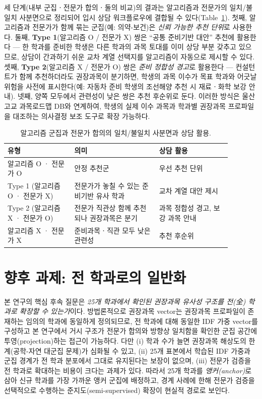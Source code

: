 \documentclass[conference]{IEEEtran}
\begin{document}
세 단계(내부 군집ㆍ전문가 합의ㆍ둘의 비교)의 결과는 알고리즘과 전문가의 일치/불일치 사분면으로 정리되어 입시 상담 워크플로우에 결합될 수 있다(Table~\ref{tab:quadrant}).
첫째, 알고리즘과 전문가가 함께 묶는 군집(예: 의약-보건)은 \emph{신뢰 가능한 추천 단위}로 사용한다.
둘째, \textbf{Type 1}(알고리즘 O / 전문가 X) 쌍은 ``공통 준비기반 대안'' 추천에 활용한다 --- 한 학과를 준비한 학생은 다른 학과의 과목 토대를 이미 상당 부분 갖추고 있으므로, 상담이 간과하기 쉬운 교차 계열 선택지를 알고리즘이 자동으로 제시할 수 있다.
셋째, \textbf{Type 2}(알고리즘 X / 전문가 O) 쌍은 \emph{준비 정합성 경고}로 활용한다 --- 컨설턴트가 함께 추천하더라도 권장과목이 분기하면, 학생의 과목 이수가 목표 학과와 어긋날 위험을 사전에 표시한다(예: 자동차 준비 학생의 조선해양 추천 시 재료ㆍ화학 보강 안내).
넷째, 양쪽 모두에서 관련성이 낮은 쌍은 추천 후순위로 둔다.
이러한 방식은 울산 고교 과목로드맵 DB와 연계하여, 학생의 실제 이수 과목과 학과별 권장과목 프로파일을 대조하는 의사결정 보조 도구로 확장 가능하다.

\begin{table}[!ht]
\centering
\footnotesize
\caption{알고리즘 군집과 전문가 합의의 일치/불일치 사분면과 상담 활용.}
\label{tab:quadrant}
\begin{tabular}{p{0.26\linewidth}p{0.33\linewidth}p{0.29\linewidth}}
\hline
유형 & 의미 & 상담 활용 \\
\hline
알고리즘 O · 전문가 O & 안정 추천군 & 우선 추천 단위 \\
Type 1 (알고리즘 O · 전문가 X) & 전문가가 놓칠 수 있는 준비기반 유사 학과 & 교차 계열 대안 제시 \\
Type 2 (알고리즘 X · 전문가 O) & 전문가 직관상 함께 추천되나 권장과목은 분기 & 과목 정합성 경고, 보강 과목 안내 \\
알고리즘 X · 전문가 X & 준비과목ㆍ직관 모두 낮은 관련성 & 추천 후순위 \\
\hline
\end{tabular}
\end{table}

\section{향후 과제: 전 학과로의 일반화}

본 연구의 핵심 후속 질문은 \emph{25개 학과에서 확인된 권장과목 유사성 구조를 전(全) 학과로 확장할 수 있는가}이다.
방법론적으로 권장과목 vector는 권장과목 프로파일이 존재하는 임의의 학과에 동일하게 정의되므로, 전 학과에 대해 동일한 IDF 가중 vector를 구성하고 본 연구에서 거시 구조가 전문가 합의와 방향상 일치함을 확인한 군집 공간에 투영(projection)하는 접근이 가능하다.
다만 (i) 학과 수가 늘면 권장과목 해상도의 한계(공학-자연 대군집 문제)가 심화될 수 있고, (ii) 25개 표본에서 학습된 IDF 가중과 군집 경계가 전 학과 분포에서 그대로 유지된다는 보장이 없으며, (iii) 전문가 검증을 전 학과로 확대하는 비용이 크다는 과제가 있다.
따라서 25개 학과를 \emph{앵커(anchor)}로 삼아 신규 학과를 가장 가까운 앵커 군집에 배정하고, 경계 사례에 한해 전문가 검증을 선택적으로 수행하는 준지도(semi-supervised) 확장이 현실적 경로로 보인다.
\end{document}
